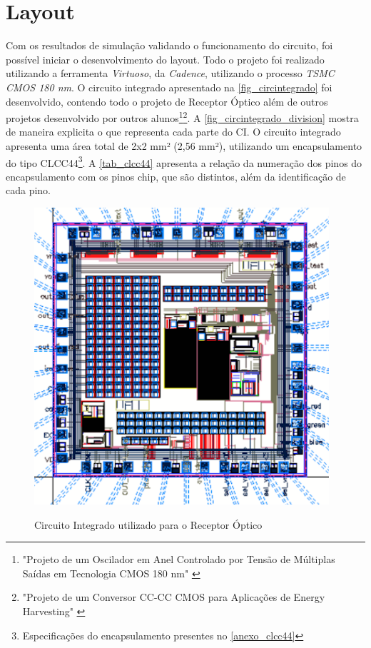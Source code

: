 \section{Layout}

Com os resultados de simulação validando o funcionamento do circuito, foi possível iniciar o desenvolvimento do layout. Todo o projeto foi realizado utilizando a ferramenta \textit{Virtuoso}, da \textit{Cadence}, utilizando o processo \textit{TSMC CMOS 180 nm}. O circuito integrado apresentado na \autoref{fig_circintegrado} foi desenvolvido, contendo todo o projeto de Receptor Óptico além de outros projetos desenvolvido por outros alunos\footnote{"Projeto de um Oscilador em Anel Controlado por Tensão de Múltiplas Saídas em Tecnologia CMOS 180 nm" \cite{VictorRodrigues}}\footnote{"Projeto de um Conversor CC-CC CMOS para Aplicações de Energy Harvesting" \cite{LucasChaves}}. A \autoref{fig_circintegrado_division} mostra de maneira explicita o que representa cada parte do CI. O circuito integrado apresenta uma área total de 2x2 mm² (2,56 mm²), utilizando um encapsulamento do tipo CLCC44\footnote{Especificações do encapsulamento presentes no \autoref{anexo_clcc44}}. A \autoref{tab_clcc44} apresenta a relação da numeração dos pinos do encapsulamento com os pinos chip, que são distintos, além da identificação de cada pino.

\begin{figure}[htb]
 \centering
    \caption{Circuito Integrado utilizado para o Receptor Óptico} 
    \includegraphics[scale=0.5]{Resultados/Imagens/CircuitoIntegrado.png}
    \label{fig_circintegrado}
\end{figure}

